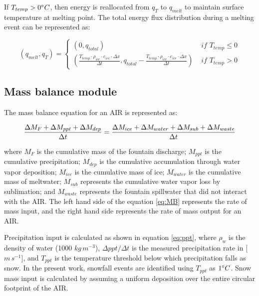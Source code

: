 If $T_{temp} > 0 ^{\circ} C$, then energy is reallocated from $q_{T}$ to $q_{melt}$ to maintain surface
temperature at melting point. The total energy flux distribution during a melting event can be represented as:

\begin{equation}
	(q_{melt}, q_{T}) = \left\{ \begin{array}{ll}
		(0, q_{total})
		                                                                                                                                                               & \textit{ if } T_{temp} \leq 0 \\
		(\frac{T_{temp} \cdot \rho_{ice} \cdot c_{ice} \cdot \Delta x}{\Delta t}, q_{total}-\frac{T_{temp} \cdot \rho_{ice} \cdot c_{ice} \cdot \Delta x}{\Delta t}  ) & \textit{ if } T_{temp} > 0
	\end{array} \right.
\end{equation}

\subsection{Mass balance module}

The mass balance equation for an \ac{AIR} is represented as:

\begin{equation}
	\frac{\Delta M_{F} + \Delta M_{ppt} + \Delta M_{dep}}{\Delta t} = \frac{\Delta M_{ice} +\Delta M_{water} +
		\Delta M_{sub} + \Delta M_{waste}}{\Delta t}  \\
	\label{eq:MB}
\end{equation}

where $M_{F}$ is the cumulative mass of the fountain discharge; $M_{ppt}$ is the cumulative precipitation;
$M_{dep}$ is the cumulative accumulation through water vapor deposition; $M_{ice}$ is the cumulative mass of
ice; $M_{water}$ is the cumulative mass of meltwater; $M_{sub}$ represents the cumulative water vapor loss by
sublimation; and $M_{waste}$ represents the fountain spillwater that did not interact with the \ac{AIR}. The
left hand side of the equation \ref{eq:MB} represents the rate of mass input, and the right hand side represents
the rate of mass output for an \ac{AIR}.

Precipitation input is calculated as shown in equation \ref{eq:ppt}, where $\rho_{w}$ is the density of water
(1000 $kg\,m^{-3}$), $\Delta ppt/ \Delta t$ is the measured precipitation rate in [$m\,s^{-1}$], and $T_{ppt}$
is the temperature threshold below which precipitation falls as snow. In the present work, snowfall events are
identified using $T_{ppt}$ as $1 ^{\circ} C$. Snow mass input is calculated by assuming a uniform deposition over
the entire circular footprint of the \ac{AIR}.

